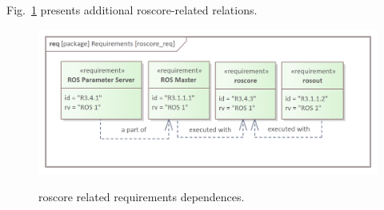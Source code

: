 \documentclass[11pt,oneside,a4paper]{article}
\begin{document}
	Fig.~\ref{fig:roscore_req} presents additional roscore-related relations.


	\begin{figure}[H]
		\centering
		\begin{center}
			{\includegraphics[scale=1]{img/requirement_pkg/roscore_req.png}}
		\end{center}
		\caption{roscore related requirements dependences.} 
		\label{fig:roscore_req}
	\end{figure}
	
	\pagebreak
	
\end{document}
